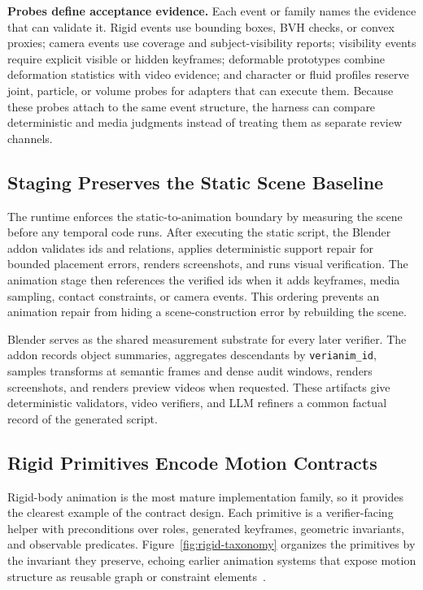 \documentclass{article}
\newcommand{\code}[1]{\texttt{#1}}
\begin{document}
\textbf{Probes define acceptance evidence.}
Each event or family names the evidence that can validate it. Rigid events use bounding boxes, BVH checks, or convex proxies; camera events use coverage and subject-visibility reports; visibility events require explicit visible or hidden keyframes; deformable prototypes combine deformation statistics with video evidence; and character or fluid profiles reserve joint, particle, or volume probes for adapters that can execute them. Because these probes attach to the same event structure, the harness can compare deterministic and media judgments instead of treating them as separate review channels.

\subsection{Staging Preserves the Static Scene Baseline}

The runtime enforces the static-to-animation boundary by measuring the scene before any temporal code runs. After executing the static script, the Blender addon validates ids and relations, applies deterministic support repair for bounded placement errors, renders screenshots, and runs visual verification. The animation stage then references the verified ids when it adds keyframes, media sampling, contact constraints, or camera events. This ordering prevents an animation repair from hiding a scene-construction error by rebuilding the scene.

Blender serves as the shared measurement substrate for every later verifier. The addon records object summaries, aggregates descendants by \code{verianim\_id}, samples transforms at semantic frames and dense audit windows, renders screenshots, and renders preview videos when requested. These artifacts give deterministic validators, video verifiers, and LLM refiners a common factual record of the generated script.

\subsection{Rigid Primitives Encode Motion Contracts}

Rigid-body animation is the most mature implementation family, so it provides the clearest example of the contract design. Each primitive is a verifier-facing helper with preconditions over roles, generated keyframes, geometric invariants, and observable predicates. Figure~\ref{fig:rigid-taxonomy} organizes the primitives by the invariant they preserve, echoing earlier animation systems that expose motion structure as reusable graph or constraint elements~\citep{kovar2002motiongraphs,witkin1988spacetime}.
\end{document}
